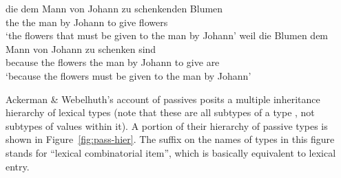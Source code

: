 \documentclass[output=paper,biblatex,babelshorthands,newtxmath,draftmode,colorlinks,citecolor=brown]{langscibook}
\begin{document}
\begin{exe}
	\ex\label{zu-pass}
	\begin{xlist}
		\ex\label{zu-pass-a}
		\gll die dem Mann von Johann zu schenkenden Blumen \\
		the the man by Johann to give flowers  \\
		\glt `the flowers that must be given to the man by Johann'
		\ex\label{zu-pass-b}
		\gll weil die Blumen dem Mann von Johann zu schenken sind \\
		because the flowers the man by Johann to give are \\
		\glt `because the flowers must be given to the man by Johann'
	\end{xlist}
\end{exe}

Ackerman \& Webelhuth's account of  passives posits a multiple inheritance hierarchy of lexical types (note that these are all subtypes of a type , not subtypes of values within it). A portion of their hierarchy of  passive types is shown in Figure~\ref{fig:pass-hier}.
The suffix  on the names of types in this figure stands for ``lexical combinatorial item'', which is basically equivalent to lexical entry.
\end{document}
